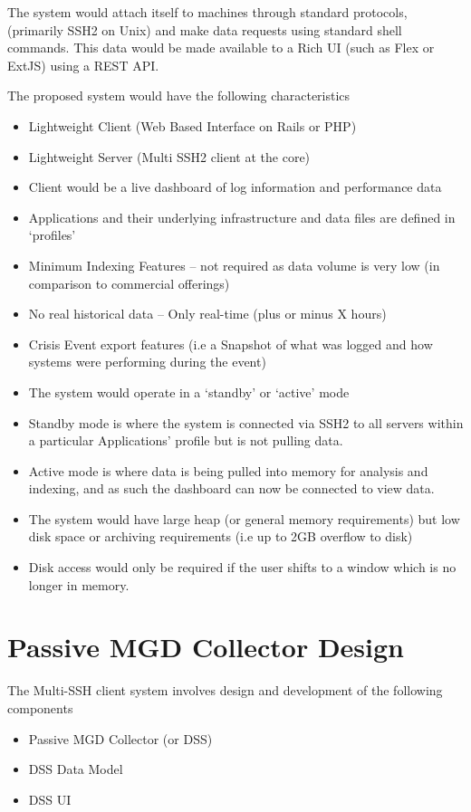 \documentclass{llncs}
\begin{document}
The system would attach itself to machines through standard protocols, (primarily SSH2 on Unix) and make data requests using standard shell commands. This data would be made available to a Rich UI (such as Flex or ExtJS) using a REST API.

The proposed system would have the following characteristics

\begin{itemize}
\item Lightweight Client (Web Based Interface on Rails or PHP)
\item 	Lightweight Server (Multi SSH2 client at the core)
\item 	Client would be a live dashboard of log information and performance data
\item 	Applications and their underlying infrastructure and data files are defined in ‘profiles’
\item 	Minimum Indexing Features – not required as data volume is very low (in comparison to commercial offerings)
\item 	No real historical data – Only real-time (plus or minus X hours)
\item 	Crisis Event export features (i.e a Snapshot of what was logged and how systems were performing during the event)
\item 	The system would operate in a ‘standby’ or ‘active’ mode
\item 	Standby mode is where the system is connected via SSH2 to all servers within a particular Applications’ profile but is not pulling data.
\item 	Active mode is where data is being pulled into memory for analysis and indexing, and as such the dashboard can now be connected to view data.
\item 	The system would have large heap (or general memory requirements) but low disk space or archiving requirements (i.e up to 2GB overflow to disk)
\item 	Disk access would only be required if the user shifts to a window which is no longer in memory.
\end{itemize}
\newpage
\section{Passive MGD Collector Design}

The Multi-SSH client system involves design and development of the following components
\begin{itemize}
\item Passive MGD Collector (or DSS)
\item	DSS Data Model
\item	DSS UI
\end{itemize}
\end{document}
